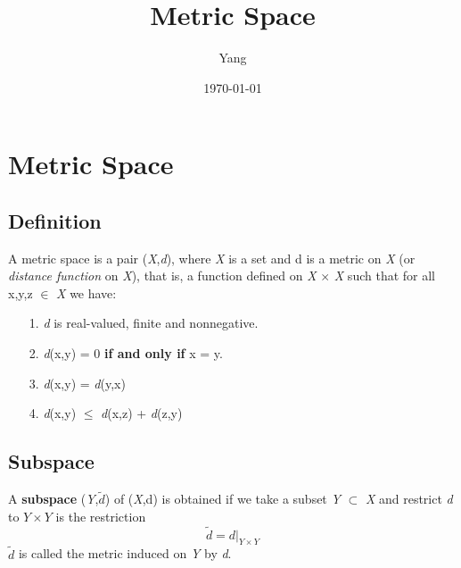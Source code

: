 \documentclass[12pt,letterpaper]{article}
\title{Metric Space}
\author{Yang}
\date{\today}
\begin{document}
\maketitle
\tableofcontents


\section{Metric Space}

\subsection{Definition}
A metric space is a pair (\textit{X},\textit{d}), where \textit{X} is a set and d is a 
metric on \textit{X} (or \textit{distance function} on \textit{X}), that is, a
function defined on \textit{X} $\times$ \textit{X} such that for all x,y,z $\in$ \textit{X} we have:
\begin{itemize}
\item[1.] \textit{d} is real-valued, finite and nonnegative. 
\item[2.] \textit{d}(x,y) = 0 \textbf{if and only if } x = y. 
\item[3.] \textit{d}(x,y) = \textit{d}(y,x)
\item[4.] \textit{d}(x,y) $\leq$ \textit{d}(x,z) + \textit{d}(z,y)
\end{itemize}

\subsection{Subspace}
A \textbf{subspace} (\textit{Y},$\widetilde{\textit{d}}$) of (\textit{X},d) is obtained if
we take a subset \textit{Y} $\subset$ \textit{X} and restrict \textit{d} to
$Y \times Y$ is the restriction
$$ \widetilde{d} = d \lvert_{Y \times Y} $$
$\widetilde{\textit{d}}$ is called the metric induced on \textit{Y} by \textit{d}.
\end{document}
